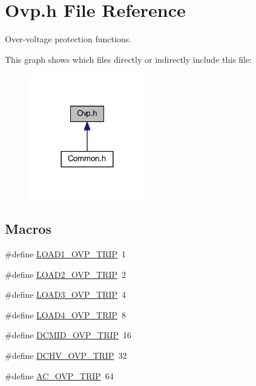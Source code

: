 \hypertarget{a00036}{\section{Ovp.\-h File Reference}
\label{a00036}
}


Over-\/voltage protection functions.  


This graph shows which files directly or indirectly include this file\-:\nopagebreak
\begin{figure}[H]
\begin{center}
\leavevmode
\includegraphics[width=144pt]{a00070}
\end{center}
\end{figure}
\subsection*{Macros}
\begin{DoxyCompactItemize}
\item 
\#define \hyperlink{a00036_a818e48bd3796e85aff1e441d395d420e}{L\-O\-A\-D1\-\_\-\-O\-V\-P\-\_\-\-T\-R\-I\-P}~1
\item 
\#define \hyperlink{a00036_a06deb869d76201f8fa804f155a6d0204}{L\-O\-A\-D2\-\_\-\-O\-V\-P\-\_\-\-T\-R\-I\-P}~2
\item 
\#define \hyperlink{a00036_a48d28ba735dc28df3ba0c96ca99c3ba0}{L\-O\-A\-D3\-\_\-\-O\-V\-P\-\_\-\-T\-R\-I\-P}~4
\item 
\#define \hyperlink{a00036_a77c2bd0f4f1081fadf180ae92c5b0b79}{L\-O\-A\-D4\-\_\-\-O\-V\-P\-\_\-\-T\-R\-I\-P}~8
\item 
\#define \hyperlink{a00036_a454809e1e9a6314875f8f833bd924bfb}{D\-C\-M\-I\-D\-\_\-\-O\-V\-P\-\_\-\-T\-R\-I\-P}~16
\item 
\#define \hyperlink{a00036_a87d04fee238f7921a66521910b42244e}{D\-C\-H\-V\-\_\-\-O\-V\-P\-\_\-\-T\-R\-I\-P}~32
\item 
\#define \hyperlink{a00036_abf1557b371e135706243aebb018260cc}{A\-C\-\_\-\-O\-V\-P\-\_\-\-T\-R\-I\-P}~64
\end{DoxyCompactItemize}
